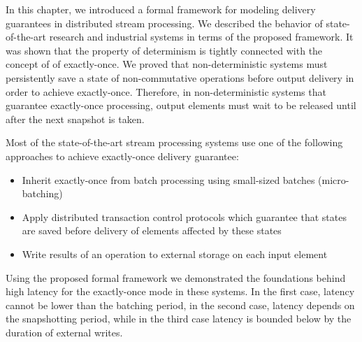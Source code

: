 In this chapter, we introduced a formal framework for modeling delivery guarantees in distributed stream processing. We described the behavior of state-of-the-art research and industrial systems in terms of the proposed framework. It was shown that the property of determinism is tightly connected with the concept of of exactly-once. We proved that non-deterministic systems must persistently save a state of non-commutative operations before output delivery in order to achieve exactly-once. Therefore, in non-deterministic systems that guarantee exactly-once processing, output elements must wait to be released until after the next snapshot is taken.

Most of the state-of-the-art stream processing systems use one of the following approaches to achieve exactly-once delivery guarantee: 

\begin{itemize}
    \item Inherit exactly-once from batch processing using small-sized batches (micro-batching)
    \item Apply distributed transaction control protocols which guarantee that states are saved before delivery of elements affected by these states
    \item Write results of an operation to external storage on each input element
\end{itemize}

Using the proposed formal framework we demonstrated the foundations behind high latency for the exactly-once mode in these systems. In the first case, latency cannot be lower than the batching period, in the second case, latency depends on the snapshotting period, while in the third case latency is bounded below by the duration of external writes.